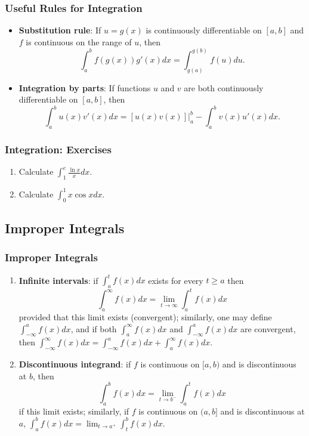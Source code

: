 \documentclass{beamer}
\begin{document}
\begin{frame}
\frametitle{Useful Rules for Integration}
\begin{itemize}
\item \textbf{Substitution rule}: If $u=g(x)$ is continuously differentiable on $[a,b]$ and $f$ is continuous on the range of $u$, then 
$$
\int_a^b f(g(x))g'(x)dx = \int_{g(a)}^{g(b)} f(u)du.
$$ 
\item \textbf{Integration by parts}: If functions $u$ and $v$ are both continuously differentiable on $[a,b]$, then
$$
\int_{a}^{b} u(x)v'(x)dx = \left .[u(x)v(x)] \right\vert_{a}^{b} - \int_{a}^{b} v(x)u'(x)dx.
$$
\end{itemize}
\end{frame}

\begin{frame}
\frametitle{Integration: Exercises}
\begin{enumerate}
\item Calculate $\int_{1}^e \frac{\ln x}{x} dx$.
\vspace*{1.2in}
\item Calculate $\int_{0}^1 x \cos x dx$.
\vspace*{1.2in}
\end{enumerate}
\end{frame}

\subsection{Improper Integrals}
\begin{frame}
\frametitle{Improper Integrals}
\begin{enumerate}
\item \textbf{Infinite intervals}: if $\int_{a}^{t}f(x)dx$ exists for every $t\geq a$ then 
$$
\int_{a}^{\infty}f(x)dx = \lim_{t \rightarrow \infty}\int_{a}^{t}f(x)dx
$$ 
provided that this limit exists (convergent); similarly, one may define $\int_{-\infty}^{a}f(x)dx$, and if both $\int_{a}^{\infty}f(x)dx$ and $\int_{-\infty}^{a}f(x)dx$ are convergent, then $\int_{-\infty}^{\infty}f(x)dx = \int_{-\infty}^{a}f(x)dx + \int_{a}^{\infty}f(x)dx$.
\item \textbf{Discontinuous integrand}: if $f$ is continuous on $[a,b)$ and is discontinuous at $b$, then
$$
\int_a^b f(x) dx = \lim_{t \rightarrow b^-} \int_a^t f(x)dx
$$
if this limit exists; similarly, if $f$ is continuous on $(a,b]$ and is discontinuous at $a$, $\int_a^b f(x) dx = \lim_{t \rightarrow a^+} \int_t^b f(x)dx$.
\end{enumerate}
\end{frame}
\end{document}

